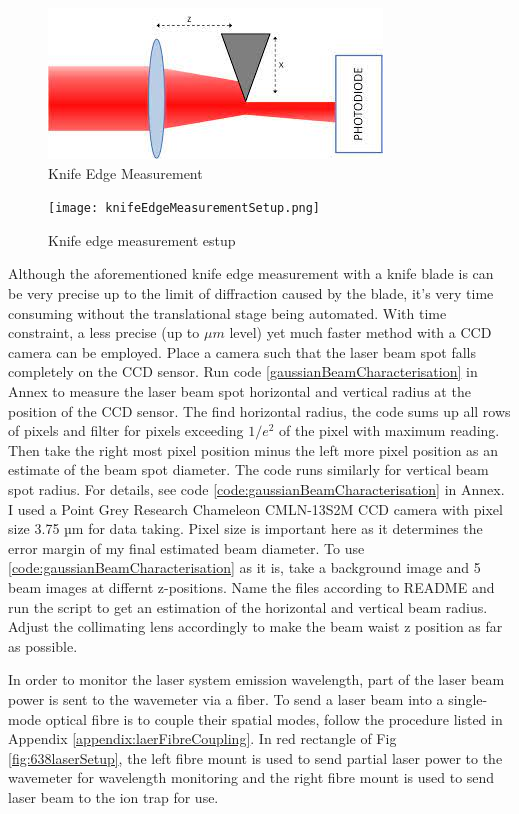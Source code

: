 \documentclass[12pt]{report}
\begin{document}
\begin{figure}[H]
    \centering
    \includegraphics[width=.6\textwidth]{knifeEdgeMeasurement.jpeg}
    \caption{Knife Edge Measurement}
    \label{fig:knifeEdgeMeasurement}
\end{figure}

\begin{figure}[H]
    \centering
    \texttt{[image: knifeEdgeMeasurementSetup.png]}
    \caption{Knife edge measurement estup}
    \label{fig:knifeEdgeMeasurementSetup}
\end{figure}

Although the aforementioned knife edge measurement with a knife blade is can be very precise up to the limit of diffraction caused by the blade, it's very time consuming without the translational stage being automated. With time constraint, a less precise (up to $\mu m$ level) yet much faster method with a CCD camera can be employed. Place a camera such that the laser beam spot falls completely on the CCD sensor. Run code \ref{gaussianBeamCharacterisation} in Annex to measure the laser beam spot horizontal and vertical radius at the position of the CCD sensor. The find horizontal radius, the code sums up all rows of pixels and filter for pixels exceeding $1/e^2$ of the pixel with maximum reading. Then take the right most pixel position minus the left more pixel position as an estimate of the beam spot diameter. The code runs similarly for vertical beam spot radius. For details, see code \ref{code:gaussianBeamCharacterisation} in Annex. I used a Point Grey Research Chameleon CMLN-13S2M CCD camera with pixel size 3.75 µm for data taking. Pixel size is important here as it determines the error margin of my final estimated beam diameter. To use \ref{code:gaussianBeamCharacterisation} as it is, take a background image and 5 beam images at differnt z-positions. Name the files according to README and run the script to get an estimation of the horizontal and vertical beam radius. Adjust the collimating lens accordingly to make the beam waist z position as far as possible. 
\\
\par
In order to monitor the laser system emission wavelength, part of the laser beam power is sent to the wavemeter via a fiber. To send a laser beam into a single-mode optical fibre is to couple their spatial modes, follow the procedure listed in Appendix \ref{appendix:laerFibreCoupling}. In red rectangle of Fig \ref{fig:638laserSetup}, the left fibre mount is used to send partial laser power to the wavemeter for wavelength monitoring and the right fibre mount is used to send laser beam to the ion trap for use. 
\end{document}
